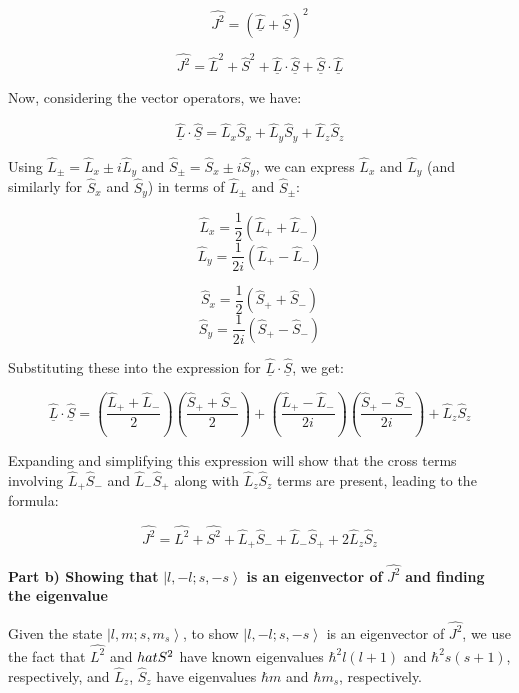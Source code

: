 \documentclass[a4paper,11pt]{article}
\begin{document}
\[ \hat{J^{2}} = (\hat{\underline{L}} + \hat{\underline{S}})^2 \]

\[ \hat{J^{2}} = \hat{L}^2 + \hat{S}^2 + \hat{\underline{L}} \cdot \hat{\underline{S}} + \hat{\underline{S}} \cdot \hat{\underline{L}} \]

Now, considering the vector operators, we have:

\[ \hat{\underline{L}} \cdot \hat{\underline{S}} = \hat{L}_{x}\hat{S}_{x} + \hat{L}_{y}\hat{S}_{y} + \hat{L}_{z}\hat{S}_{z} \]

Using \( \hat{L}_{\pm} = \hat{L}_{x} \pm i\hat{L}_{y} \) and \( \hat{S}_{\pm} = \hat{S}_{x} \pm i\hat{S}_{y} \), we can express \( \hat{L}_{x} \) and \( \hat{L}_{y} \) (and similarly for \( \hat{S}_{x} \) and \( \hat{S}_{y} \)) in terms of \( \hat{L}_{\pm} \) and \( \hat{S}_{\pm} \):

\[ \hat{L}_{x} = \frac{1}{2}(\hat{L}_{+} + \hat{L}_{-}) \]
\[ \hat{L}_{y} = \frac{1}{2i}(\hat{L}_{+} - \hat{L}_{-}) \]

\[ \hat{S}_{x} = \frac{1}{2}(\hat{S}_{+} + \hat{S}_{-}) \]
\[ \hat{S}_{y} = \frac{1}{2i}(\hat{S}_{+} - \hat{S}_{-}) \]

Substituting these into the expression for \( \hat{\underline{L}} \cdot \hat{\underline{S}} \), we get:

\[ \hat{\underline{L}} \cdot \hat{\underline{S}} = \left( \frac{\hat{L}_{+} + \hat{L}_{-}}{2} \right) \left( \frac{\hat{S}_{+} + \hat{S}_{-}}{2} \right) + \left( \frac{\hat{L}_{+} - \hat{L}_{-}}{2i} \right) \left( \frac{\hat{S}_{+} - \hat{S}_{-}}{2i} \right) + \hat{L}_{z}\hat{S}_{z} \]

Expanding and simplifying this expression will show that the cross terms involving \( \hat{L}_{+}\hat{S}_{-} \) and \( \hat{L}_{-}\hat{S}_{+} \) along with \( \hat{L}_{z}\hat{S}_{z} \) terms are present, leading to the formula:

\[ \hat{J^{2}} = \hat{L^{2}} + \hat{S^{2}} + \hat{L}_{+}\hat{S}_{-} + \hat{L}_{-}\hat{S}_{+} + 2\hat{L}_{z}\hat{S}_{z} \]

\textbf{Part b) Showing that} \( \left|l, -l; s, -s \right> \) \textbf{is an eigenvector of} \( \hat{J^{2}} \) \textbf{and finding the eigenvalue}

Given the state \( \left|l, m; s, m_{s} \right> \), to show \( \left|l, -l; s, -s \right> \) is an eigenvector of \( \hat{J^{2}} \), we use the fact that \( \hat{L^{2}} \) and \( \\hat{S^{2}} \) have known eigenvalues \( \hbar^2 l(l+1) \) and \( \hbar^2 s(s+1) \), respectively, and \( \hat{L}_{z} \), \( \hat{S}_{z} \) have eigenvalues \( \hbar m \) and \( \hbar m_{s} \), respectively.
\end{document}
